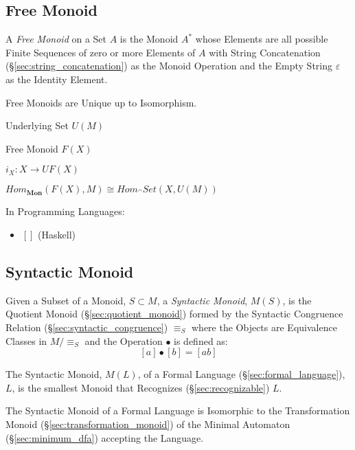 \subsection{Free Monoid}\label{sec:free_monoid}

A \emph{Free Monoid} on a Set $A$ is the Monoid $A^*$ whose Elements
are all possible Finite Sequences of zero or more Elements of $A$ with
String Concatenation (\S\ref{sec:string_concatenation}) as the Monoid
Operation and the Empty String $\varepsilon$ as the Identity Element.

Free Monoids are Unique up to Isomorphism.

Underlying Set $U(M)$

Free Monoid $F(X)$

$i_X : X \rightarrow U F (X)$

$Hom_\mathbf{Mon}(F(X), M) \cong Hom_\cat{Set}(X, U(M))$

In Programming Languages:

\begin{itemize}
  \item $\mathtt{[]}$ (Haskell)
\end{itemize}



\subsection{Syntactic Monoid}\label{sec:syntactic_monoid}

Given a Subset of a Monoid, $S \subset M$, a \emph{Syntactic Monoid},
$M(S)$, is the Quotient Monoid (\S\ref{sec:quotient_monoid}) formed by
the Syntactic Congruence Relation (\S\ref{sec:syntactic_congruence})
$\equiv_S$ where the Objects are Equivalence Classes in $M / \equiv_S$
and the Operation $\bullet$ is defined as:
\[
  [a] \bullet [b] = [ab]
\]

The Syntactic Monoid, $M(L)$, of a Formal Language
(\S\ref{sec:formal_language}), $L$, is the smallest Monoid that
Recognizes (\S\ref{sec:recognizable}) $L$.

The Syntactic Monoid of a Formal Language is Isomorphic to the
Transformation Monoid (\S\ref{sec:transformation_monoid}) of the
Minimal Automaton (\S\ref{sec:minimum_dfa}) accepting the Language.

